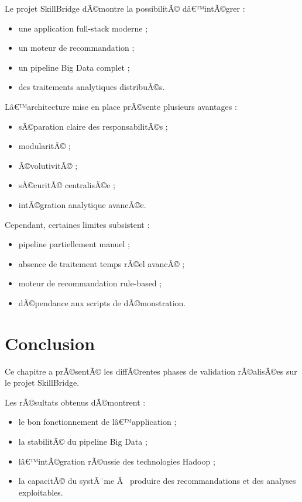 ﻿\documentclass[12pt,a4paper]{report}
\begin{document}
Le projet SkillBridge dÃ©montre la possibilitÃ© dâ€™intÃ©grer :
\begin{itemize}
    \item une application full-stack moderne ;
    \item un moteur de recommandation ;
    \item un pipeline Big Data complet ;
    \item des traitements analytiques distribuÃ©s.
\end{itemize}

Lâ€™architecture mise en place prÃ©sente plusieurs avantages :
\begin{itemize}
    \item sÃ©paration claire des responsabilitÃ©s ;
    \item modularitÃ© ;
    \item Ã©volutivitÃ© ;
    \item sÃ©curitÃ© centralisÃ©e ;
    \item intÃ©gration analytique avancÃ©e.
\end{itemize}

Cependant, certaines limites subsistent :
\begin{itemize}
    \item pipeline partiellement manuel ;
    \item absence de traitement temps rÃ©el avancÃ© ;
    \item moteur de recommandation rule-based ;
    \item dÃ©pendance aux scripts de dÃ©monstration.
\end{itemize}

\section{Conclusion}

Ce chapitre a prÃ©sentÃ© les diffÃ©rentes phases de validation rÃ©alisÃ©es sur le projet SkillBridge.

Les rÃ©sultats obtenus dÃ©montrent :
\begin{itemize}
    \item le bon fonctionnement de lâ€™application ;
    \item la stabilitÃ© du pipeline Big Data ;
    \item lâ€™intÃ©gration rÃ©ussie des technologies Hadoop ;
    \item la capacitÃ© du systÃ¨me Ã  produire des recommandations et des analyses exploitables.
\end{itemize}
\end{document}
